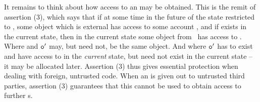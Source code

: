 It remains to think about how access to an  may be obtained. This is the remit of assertion (3),
which says that if at some time in the future of the state restricted to \SF, 
some object  which is external has access to some account , and if  exists in the 
current state, then in the current state some object 
from \SF~has access to . Where  and ${\mbox{\tt{o}}}'$ may, but need not, be the same object. And where
 ${\mbox{\tt{o}}}'$ has to exist and have access to  in the \emph{current} state, but 
 need not exist in the current state -- it may be allocated later.
Assertion (3) thus gives essential protection when dealing with foreign, untrusted code.
When an  is given out to untrusted third parties, assertion (3) guarantees that
this  cannot be used to obtain access to further  s. 


\vspace{.1cm}

